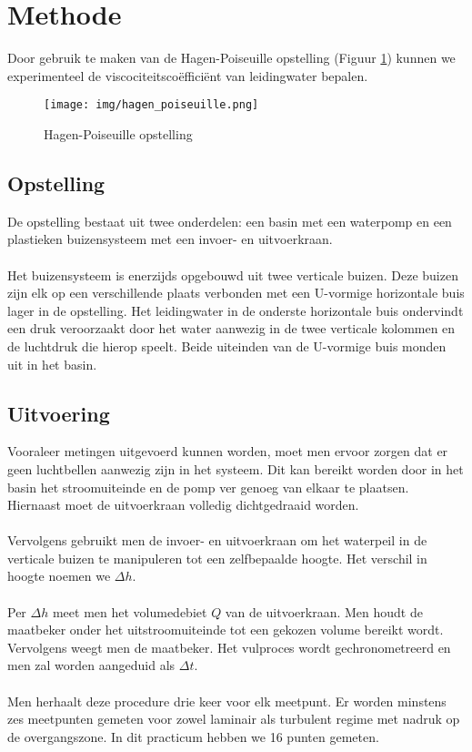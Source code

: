 \section{Methode}

Door gebruik te maken van de Hagen-Poiseuille opstelling (Figuur \ref{fig:hagen-pois}) 
kunnen we experimenteel de viscociteitsco\"effici\"ent van leidingwater bepalen. \\

\begin{figure}[h]
    \centering
    \caption{Hagen-Poiseuille opstelling}
    \texttt{[image: img/hagen\_poiseuille.png]}
    \label{fig:hagen-pois}
\end{figure}

\subsection{Opstelling}

De opstelling bestaat uit twee onderdelen: een basin
met een waterpomp en een plastieken buizensysteem met
een invoer- en uitvoerkraan.
\\ \\
Het buizensysteem is enerzijds opgebouwd uit twee verticale 
buizen. Deze buizen zijn elk op een verschillende plaats 
verbonden met een U-vormige horizontale buis lager in de opstelling.
Het leidingwater in de onderste horizontale buis ondervindt een 
druk veroorzaakt door het water aanwezig in de twee verticale
kolommen en de luchtdruk die hierop speelt. Beide uiteinden van de 
U-vormige buis monden uit in het basin.

\subsection{Uitvoering}

Vooraleer metingen uitgevoerd kunnen worden, moet men ervoor zorgen 
dat er geen luchtbellen aanwezig zijn in het systeem. 
Dit kan bereikt worden door in het basin het stroomuiteinde en de pomp
ver genoeg van elkaar te plaatsen. Hiernaast moet de uitvoerkraan 
volledig dichtgedraaid worden.
\\ \\
Vervolgens gebruikt men de invoer- en uitvoerkraan om
het waterpeil in de verticale buizen te manipuleren tot
een zelfbepaalde hoogte. Het verschil in hoogte noemen we
$\Delta h$.
\\ \\
Per $\Delta h$ meet men het volumedebiet $Q$ van de
uitvoerkraan. Men houdt de maatbeker onder het uitstroomuiteinde 
tot een gekozen volume bereikt wordt.
Vervolgens weegt men de maatbeker. Het vulproces wordt gechronometreerd
en men zal worden aangeduid als $\Delta t$.
\\ \\
Men herhaalt deze procedure drie keer voor elk meetpunt. 
Er worden minstens zes meetpunten gemeten voor zowel laminair 
als turbulent regime met nadruk op de overgangszone. In dit practicum
hebben we 16 punten gemeten.

